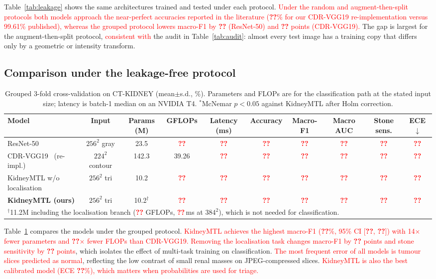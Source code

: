 \documentclass[conference]{IEEEtran}
\newcommand{\tbd}{\textcolor{red}{\textbf{??}}}            %
\newcommand{\finding}[1]{\textcolor{red}{#1}}             %
\begin{document}
Table~\ref{tab:leakage} shows the same architectures trained and tested under each protocol.
\finding{Under the random and augment-then-split protocols both models approach the near-perfect accuracies
reported in the literature (\tbd\% for our CDR-VGG19 re-implementation versus 99.61\% published), whereas the
grouped protocol lowers macro-F1 by \tbd{} (ResNet-50) and \tbd{} points (CDR-VGG19).} The gap is largest for
the augment-then-split protocol, \finding{consistent with} the audit in Table~\ref{tab:audit}: almost every test
image has a training copy that differs only by a geometric or intensity transform.

\subsection{Comparison under the leakage-free protocol}
\begin{table}[t]
\centering
\caption{Grouped 3-fold cross-validation on CT-KIDNEY (mean$\pm$s.d., \%). Parameters and FLOPs are for the
classification path at the stated input size; latency is batch-1 median on an NVIDIA T4. $^\ast$McNemar
$p<0.05$ against KidneyMTL after Holm correction.}
\label{tab:main}
\small\setlength{\tabcolsep}{4pt}
\begin{tabular}{lccccccccc}
\toprule
Model & Input & Params (M) & GFLOPs & Latency (ms) & Accuracy & Macro-F1 & Macro AUC & Stone sens. & ECE $\downarrow$ \\
\midrule
ResNet-50~\cite{he2016resnet} & $256^2$ gray & 23.5 & \tbd & \tbd & \tbd & \tbd & \tbd & \tbd & \tbd \\
CDR-VGG19~\cite{devi2025cdr} (re-impl.) & $224^2$ contour & 142.3 & 39.26 & \tbd & \tbd & \tbd & \tbd & \tbd & \tbd \\
KidneyMTL w/o localisation & $256^2$ tri & 10.2 & \tbd & \tbd & \tbd & \tbd & \tbd & \tbd & \tbd \\
\textbf{KidneyMTL (ours)} & $256^2$ tri & 10.2$^\dagger$ & \tbd & \tbd & \tbd & \tbd & \tbd & \tbd & \tbd \\
\bottomrule
\multicolumn{10}{l}{\footnotesize $^\dagger$11.2M including the localisation branch (\tbd{} GFLOPs, \tbd\,ms at $384^2$), which is not needed for classification.}
\end{tabular}
\end{table}

Table~\ref{tab:main} compares the models under the grouped protocol.
\finding{KidneyMTL achieves the highest macro-F1 (\tbd\%, 95\% CI [\tbd, \tbd]) with 14$\times$ fewer parameters
and \tbd$\times$ fewer FLOPs than CDR-VGG19.} \finding{Removing the localisation task changes macro-F1 by \tbd{}
points and stone sensitivity by \tbd{} points}, which isolates the effect of multi-task training on
classification. \finding{The most frequent error of all models is tumour slices predicted as normal}, reflecting
the low contrast of small renal masses on JPEG-compressed slices. \finding{KidneyMTL is also the best calibrated
model (ECE \tbd\%), which matters when probabilities are used for triage.}
\end{document}

